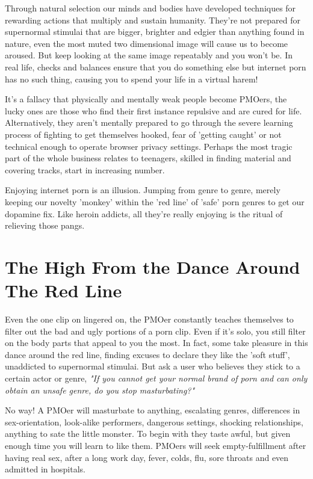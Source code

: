 \documentclass[easypeasy.tex]{subfiles}
\begin{document}
Through natural selection our minds and bodies have developed techniques for rewarding actions that multiply and sustain humanity. They're not prepared for supernormal stimulai that are bigger, brighter and edgier than anything found in nature, even the most muted two dimensional image will cause us to become aroused. But keep looking at the same image repeatably and you won't be. In real life, checks and balances ensure that you do something else but internet porn has no such thing, causing you to spend your life in a virtual harem!

It's a fallacy that physically and mentally weak people become PMOers, the lucky ones are those who find their first instance repulsive and are cured for life. Alternatively, they aren't mentally prepared to go through the severe learning process of fighting to get themselves hooked, fear of 'getting caught' or not technical enough to operate browser privacy settings. Perhaps the most tragic part of the whole business relates to teenagers, skilled in finding material and covering tracks, start in increasing number.

Enjoying internet porn is an illusion. Jumping from genre to genre, merely keeping our novelty 'monkey' within the 'red line' of 'safe' porn genres to get our dopamine fix. Like heroin addicts, all they're  really enjoying is the ritual of relieving those pangs.

\section{The High From the Dance Around The Red Line}
Even the one clip on lingered on, the PMOer constantly teaches themselves to filter out the bad and ugly portions of a porn clip. Even if it's solo, you still filter on the body parts that appeal to you the most. In fact, some take pleasure in this dance around the red line, finding excuses to declare they like the 'soft stuff', unaddicted to supernormal stimulai. But ask a user who believes they stick to a certain actor or genre, \textit{"If you cannot get your normal brand of porn and can only obtain an unsafe genre, do you stop masturbating?"}

No way! A PMOer will masturbate to anything, escalating genres, differences in sex-orientation, look-alike performers, dangerous settings, shocking relationships, anything to sate the little monster. To begin with they taste awful, but given enough time you will learn to like them. PMOers will seek empty-fulfillment after having real sex, after a long work day, fever, colds, flu, sore throats and even admitted in hospitals.
\end{document}
